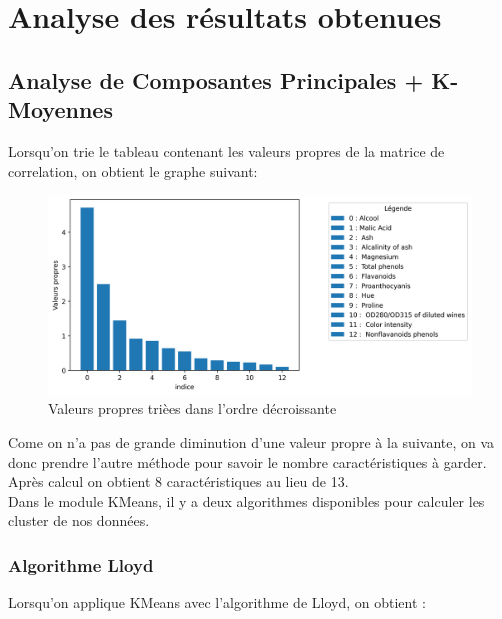 \documentclass[a4paper,12pt]{article}
\begin{document}
\newpage

\section{Analyse des résultats obtenues}
\label{sec:analyse}

\subsection{Analyse de Composantes Principales + K-Moyennes}

Lorsqu'on trie le tableau contenant les valeurs propres de la matrice de correlation, on obtient le graphe suivant: \\

\begin{figure}[h!] %
   \centering
   \includegraphics[width=1\textwidth]{vp.png} %
   \caption{Valeurs propres trièes dans l'ordre décroissante}
   \label{fig:vp} %
\end{figure}  
             
Come on n'a pas de grande diminution d'une valeur propre à la suivante, on va donc prendre l'autre méthode pour savoir le nombre caractéristiques à garder. Après calcul on obtient 8 caractéristiques au lieu de 13.\\

Dans le module KMeans, il y a deux algorithmes disponibles pour calculer les cluster de nos données.

\subsubsection{Algorithme Lloyd}

Lorsqu'on applique KMeans avec l'algorithme de Lloyd, on obtient :

\newpage
\end{document}
